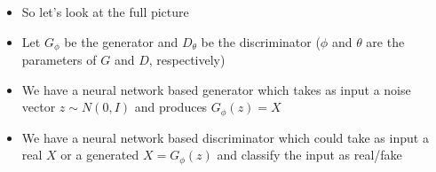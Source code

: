 \begin{frame}
	\begin{columns}
		\begin{overlayarea}{\textwidth}{\textheight}
			\vspace*{10mm}
			\begin{center}
						
			\end{center}		
		\end{overlayarea}

		\begin{overlayarea}{\textwidth}{\textheight}
			\begin{itemize}[<+->]
				\item So let's look at the full picture
				\item Let $G_\phi$ be the generator and $D_\theta$ be the discriminator ($\phi$ and $\theta$ are the parameters of $G$ and $D$, respectively)
				\item We have a neural network based generator which takes as input a noise vector $z \sim N(0, I)$ and produces $G_\phi(z) = X$
				\item We have a neural network based discriminator which could take as input a real $X$ or a generated $X = G_\phi(z)$ and classify the input as real/fake
			\end{itemize}
		\end{overlayarea}
	\end{columns}
\end{frame}

